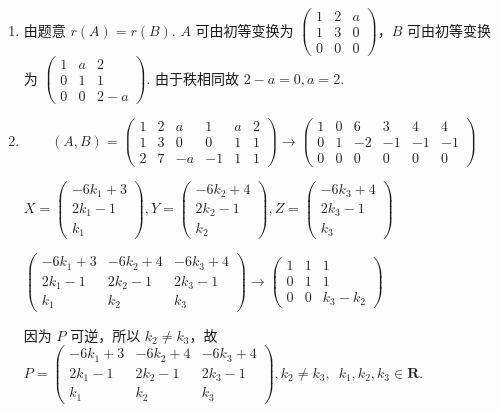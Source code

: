 \documentclass[UTF8,12pt,a4paper,fontset=fandol]{ctexart}
\begin{document}
\begin{solve}
\begin{enumerate}
                \item 由题意 $r(A)=r(B)$. $A$ 可由初等变换为 $\begin{pmatrix}1 & 2 & a \\ 1 & 3 & 0 \\ 0 & 0 & 0\end{pmatrix}$，$B$ 可由初等变换为 $\begin{pmatrix}1 & a & 2 \\ 0 & 1 & 1 \\ 0 & 0 & 2-a\end{pmatrix}$. 由于秩相同故 $2-a=0,a=2$.

                \item 
\[(A,B)=\begin{pmatrix}1 & 2 & a & 1 & a & 2 \\ 1 & 3 & 0 & 0 & 1 & 1 \\ 2 & 7 & -a & -1 & 1 & 1\end{pmatrix}\rightarrow\begin{pmatrix}1 & 0 & 6 & 3 & 4 & 4 \\ 0 & 1 & -2 & -1 & -1 & -1 \\ 0 & 0 & 0 & 0 & 0 & 0\end{pmatrix}\]


                        $X = \begin{pmatrix}-6k_1+3 \\ 2k_1-1 \\ k_1\end{pmatrix},Y = \begin{pmatrix}-6k_2+4 \\ 2k_2-1 \\ k_2\end{pmatrix},Z = \begin{pmatrix}-6k_3+4 \\ 2k_3-1 \\ k_3\end{pmatrix}$

                        $\begin{pmatrix}-6k_1+3 & -6k_2+4 & -6k_3+4 \\ 2k_1-1 & 2k_2-1 & 2k_3-1 \\ k_1 & k_2 & k_3\end{pmatrix}\rightarrow \begin{pmatrix}1 & 1 & 1 \\ 0 & 1 & 1 \\ 0 & 0 & k_3-k_2\end{pmatrix}$

                        因为 $P$ 可逆，所以 $k_2\neq k_3$，故 $P=\begin{pmatrix}-6k_1+3 & -6k_2+4 & -6k_3+4 \\ 2k_1-1 & 2k_2-1 & 2k_3-1 \\ k_1 & k_2 & k_3\end{pmatrix},k_2\neq k_3,\enspace k_1,k_2,k_3 \in \mathbf{R}$.
            \end{enumerate}
\end{solve}
\end{document}

